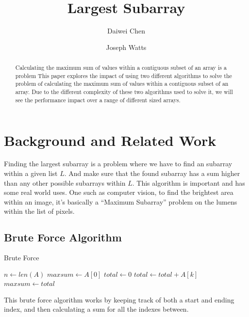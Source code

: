 \documentclass[10pt, letterpaper]{article}
\title{Largest Subarray}
\author{Daiwei Chen \and Joseph Watts}
\begin{document}
	\maketitle
	\begin{abstract}
		Calculating the maximum sum of values within a contiguous subset of an array is a problem 
		This paper explores the impact of using two different algorithms to solve the problem of calculating the maximum sum of values within a contiguous subset of an array.
		Due to the different complexity of these two algorithms used to solve it, 
		we will see the performance impact over a range of different sized arrays.
	\end{abstract}
	\section{Background and Related Work}
  Finding the largest subarray is a problem where we have to find an subarray within a given list $L$. And make sure that the found subarray has a sum higher than any other possible subarrays within $L$.
  This algorithm is important and has some real world uses. One such as computer vision, to find the brightest area within an image, it's basically a ``Maximum Subarray'' problem on the lumens within the list of pixels.

	\subsection{Brute Force Algorithm}

	\begin{algorithm}
	\begin{algorithmic}
		\caption{Brute Force}\label{bruteforce}
	\State $n\gets len(A)$
	\State $maxsum\gets A[0]$
	\State $total\gets 0$
	\State $total\gets total + A[k]$
	\EndFor
	\State $maxsum\gets total$
	\EndIf
	\EndFor
	\EndFor
	\EndFunction
	\end{algorithmic}
	\end{algorithm}


	This brute force algorithm works by keeping track of both a start and ending index, and then calculating a sum for all the indexes between.
\end{document}
